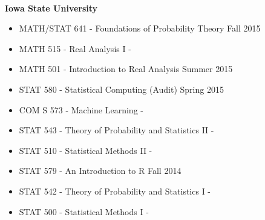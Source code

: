 \documentclass{res} %
\begin{document}
\begin{resume}
\hrulefill \\
{\bf Iowa State University }
\begin{itemize}\itemsep -2pt 
\item MATH/STAT 641 - Foundations of Probability Theory \dotfill Fall 2015
\item MATH 515 - Real Analysis I \hfill -
\item MATH 501 - Introduction to Real Analysis \dotfill Summer 2015 
\item STAT 580 - Statistical Computing (Audit) \dotfill Spring 2015
\item COM S 573 - Machine Learning \hfill -
\item STAT 543 - Theory of Probability and Statistics II \hfill -
\item STAT 510 - Statistical Methods II \hfill -
\item STAT 579 - An Introduction to R \dotfill Fall 2014
\item STAT 542 - Theory of Probability and Statistics I \hfill -
\item STAT 500 - Statistical Methods I \hfill -
\end{itemize}



\end{resume} 
\end{document}
